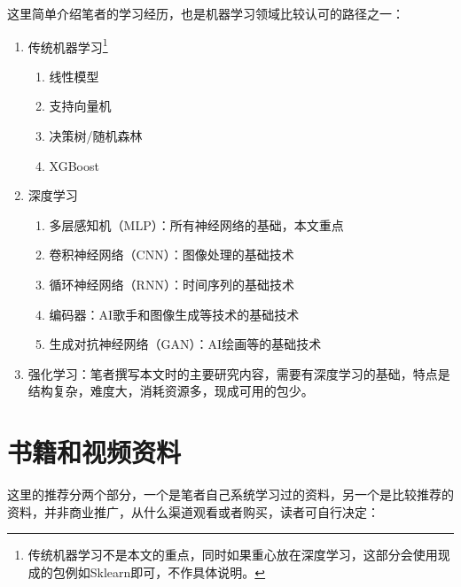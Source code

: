 \documentclass[a5paper, 11pt]{ctexbook}
\begin{document}
这里简单介绍笔者的学习经历，也是机器学习领域比较认可的路径之一\label{route}：
\begin{enumerate}
    \item[(1)] 传统机器学习\footnote{传统机器学习不是本文的重点，同时如果重心放在深度学习，这部分会使用现成的包例如Sklearn即可，不作具体说明。}
        \begin{enumerate}
            \item 线性模型
            \item 支持向量机
            \item 决策树/随机森林
            \item XGBoost
        \end{enumerate}
    \item[(2)] 深度学习
        \begin{enumerate}
            \item 多层感知机（MLP）：所有神经网络的基础，本文重点
            \item 卷积神经网络（CNN）：图像处理的基础技术
            \item 循环神经网络（RNN）：时间序列的基础技术
            \item 编码器：AI歌手和图像生成等技术的基础技术
            \item 生成对抗神经网络（GAN）：AI绘画等的基础技术
        \end{enumerate}
    \item[(3)] 强化学习：笔者撰写本文时的主要研究内容，需要有深度学习的基础，特点是结构复杂，难度大，消耗资源多，现成可用的包少。
\end{enumerate}

\section*{书籍和视频资料}
这里的推荐分两个部分，一个是笔者自己系统学习过的资料，另一个是比较推荐的资料，并非商业推广，从什么渠道观看或者购买，读者可自行决定：
\end{document}
